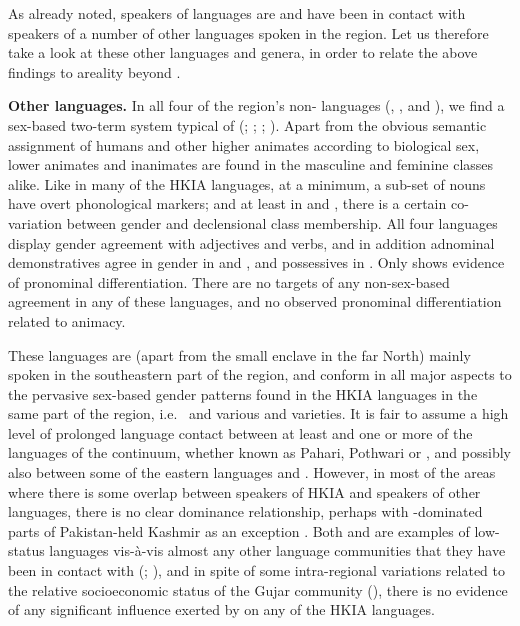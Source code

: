 \documentclass[output=collectionpaper]{langsci/langscibook}
\begin{document}
As already noted, speakers of  languages are and have been in contact with speakers of a number of other languages spoken in the region. Let us therefore take a look at these other languages and genera, in order to relate the above findings to areality beyond .

\textbf{Other  languages.} In all four of the region's non- languages (, ,  and ), we find a sex-based two-term system typical of  (\citealt{Rehman2011}; \citealt{Weinreich2011}; \citealt{Kogan2011}; \citealt[105--201]{Losey2002}). Apart from the obvious semantic assignment of humans and other higher animates according to biological sex, lower animates and inanimates are found in the masculine and feminine classes alike. Like in many of the HKIA languages, at a minimum, a sub-set of nouns have overt phonological markers; and at least in  and , there is a certain co-variation between gender and declensional class membership. All four languages display gender agreement with adjectives and verbs, and in addition adnominal demonstratives agree in gender in  and , and possessives in . Only  shows evidence of pronominal differentiation. There are no targets of any non-sex-based agreement in any of these languages, and no observed pronominal differentiation related to animacy.

These languages are (apart from the small  enclave in the far North) mainly spoken in the southeastern part of the region, and conform in all major aspects to the pervasive sex-based gender patterns found in the HKIA languages in the same part of the region, i.e.\  and various  and  varieties. It is fair to assume a high level of prolonged language contact between at least  and one or more of the languages of the  continuum, whether known as Pahari, Pothwari or , and possibly also between some of the eastern  languages and . However, in most of the areas where there is some overlap between speakers of HKIA and speakers of other  languages, there is no clear dominance relationship, perhaps with -dominated parts of Pakistan-held Kashmir as an exception \citep[219]{Rehman2011a}. Both  and  are examples of low-status languages vis-à-vis almost any other language communities that they have been in contact with (\citealt[2--4]{Losey2002}; \citealt{Weinreich1999}), and in spite of some intra-regional variations related to the relative socioeconomic status of the Gujar community (\citealt[98--99, 143--144]{Hallberg1992}), there is no evidence of any significant influence exerted by  on any of the HKIA languages.
\end{document}
